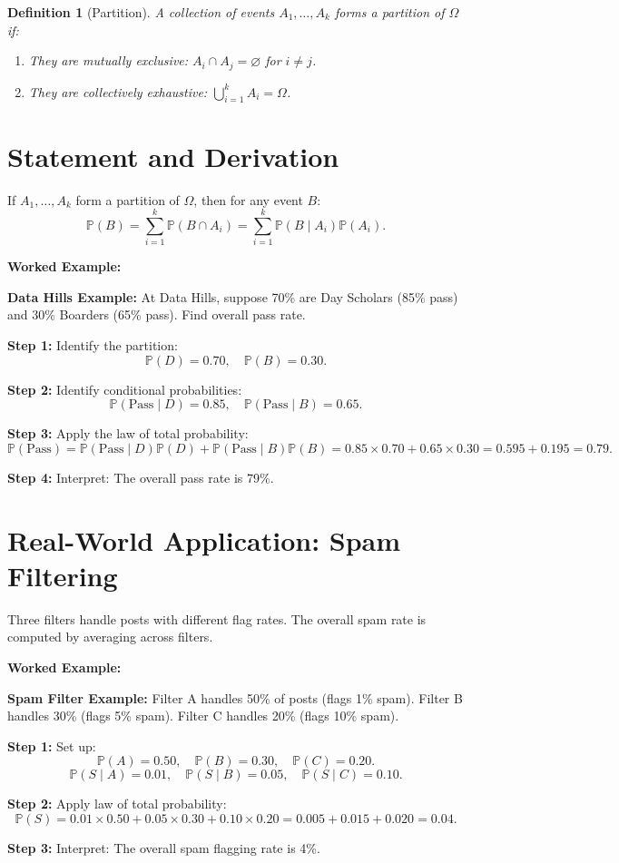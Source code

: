 \documentclass[12pt,a4paper,oneside]{report}
\theoremstyle{mytheorem}
\theoremstyle{mydefinition}
\newtheorem{definition}[theorem]{Definition}
\theoremstyle{myremark}
\newenvironment{worked}{%
  \par\medskip\noindent\textbf{\color{myorange}Worked Example:}\par\smallskip
}{%
  \par\medskip
}
\newcommand{\Prob}{\mathbb{P}}
\begin{document}
\begin{definition}[Partition]
A collection of events $A_1, \ldots, A_k$ forms a partition of $\Omega$ if:
\begin{enumerate}
    \item They are mutually exclusive: $A_i \cap A_j = \varnothing$ for $i \neq j$.
    \item They are collectively exhaustive: $\bigcup_{i=1}^k A_i = \Omega$.
\end{enumerate}
\end{definition}

\section{Statement and Derivation}
If $A_1, \dots, A_k$ form a partition of $\Omega$, then for any event $B$:
\[
\Prob(B) = \sum_{i=1}^k \Prob(B \cap A_i) = \sum_{i=1}^k \Prob(B \mid A_i) \Prob(A_i).
\]

\begin{worked}
\textbf{Data Hills Example:}
At Data Hills, suppose 70\% are Day Scholars (85\% pass) and 30\% Boarders (65\% pass). Find overall pass rate.

\textbf{Step 1:} Identify the partition:
\[
\Prob(D) = 0.70,\quad \Prob(B) = 0.30.
\]

\textbf{Step 2:} Identify conditional probabilities:
\[
\Prob(\text{Pass} \mid D) = 0.85,\quad \Prob(\text{Pass} \mid B) = 0.65.
\]

\textbf{Step 3:} Apply the law of total probability:
\[
\Prob(\text{Pass}) = \Prob(\text{Pass} \mid D)\Prob(D) + \Prob(\text{Pass} \mid B)\Prob(B)
= 0.85 \times 0.70 + 0.65 \times 0.30 = 0.595 + 0.195 = 0.79.
\]

\textbf{Step 4:} Interpret: The overall pass rate is 79\%.
\end{worked}

\section{Real-World Application: Spam Filtering}
Three filters handle posts with different flag rates. The overall spam rate is computed by averaging across filters.

\begin{worked}
\textbf{Spam Filter Example:}
Filter A handles 50\% of posts (flags 1\% spam). Filter B handles 30\% (flags 5\% spam). Filter C handles 20\% (flags 10\% spam).

\textbf{Step 1:} Set up:
\[
\Prob(A) = 0.50,\quad \Prob(B) = 0.30,\quad \Prob(C) = 0.20.
\]
\[
\Prob(S \mid A) = 0.01,\quad \Prob(S \mid B) = 0.05,\quad \Prob(S \mid C) = 0.10.
\]

\textbf{Step 2:} Apply law of total probability:
\[
\Prob(S) = 0.01 \times 0.50 + 0.05 \times 0.30 + 0.10 \times 0.20
= 0.005 + 0.015 + 0.020 = 0.04.
\]

\textbf{Step 3:} Interpret: The overall spam flagging rate is 4\%.
\end{worked}
\end{document}
